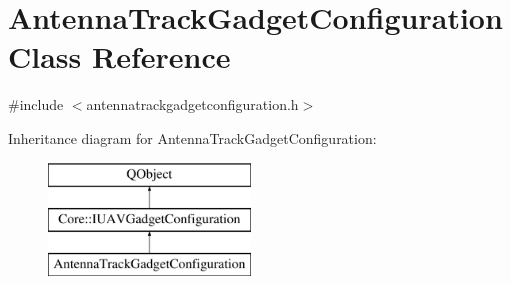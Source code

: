 \hypertarget{class_antenna_track_gadget_configuration}{\section{Antenna\-Track\-Gadget\-Configuration Class Reference}
\label{class_antenna_track_gadget_configuration}
}


{\ttfamily \#include $<$antennatrackgadgetconfiguration.\-h$>$}

Inheritance diagram for Antenna\-Track\-Gadget\-Configuration\-:\begin{figure}[H]
\begin{center}
\leavevmode
\includegraphics[height=3.000000cm]{class_antenna_track_gadget_configuration}
\end{center}
\end{figure}
